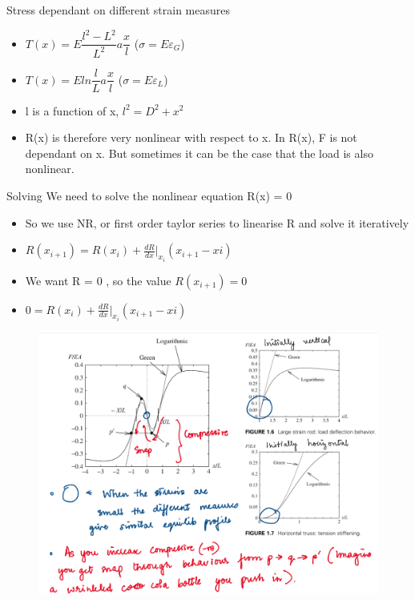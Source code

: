 	\begin{frame}
		
	\begin{block}{Stress dependant on different strain measures}
		\begin{itemize}
			\item $T(x) = E \dfrac{l^2-L^2}{L^2} a \dfrac{x}{l}$  \hfill ($\sigma =  E \varepsilon_G$)
			\item $T(x) = E ln\dfrac{l}{L} a \dfrac{x}{l}$ \hfill	($\sigma =  E \varepsilon_L$)			
		\end{itemize}
	\end{block}

	\begin{itemize}
		\item l is a function of x, $l^2=D^2+x^2$
		\item R(x) is therefore very nonlinear with respect to x. In R(x), F is not dependant on x. But sometimes it can be the case that the load is also nonlinear.	
	\end{itemize}
	
	\begin{block}{Solving}
		We need to solve the nonlinear equation R(x) = 0
		
		\begin{itemize}
			\item So we use NR, or first order taylor series to linearise R and solve it iteratively
			
			\item $R(x_{i+1}) = R(x_{i}) + \frac{dR}{dx}|_{x_{i}}(x_{i+1}-x{i})$
			\item We want R = 0 , so the value $R(x_{i+1}) = 0$
			\item  $0 = R(x_{i}) + \frac{dR}{dx}|_{x_{i}}(x_{i+1}-x{i})$		
		\end{itemize}
	\end{block}
	\end{frame}

	\begin{frame}
		\begin{figure}
			\centering
			\includegraphics[width=1\linewidth]{Figure/fig5}
			\label{fig:fig1}
		\end{figure}
	\end{frame}

